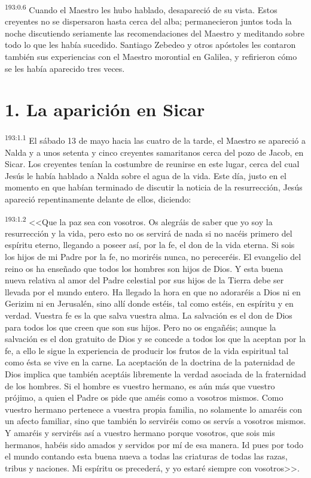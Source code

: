 \par 
\textsuperscript{193:0.6} Cuando el Maestro les hubo hablado, desapareció de su vista. Estos creyentes no se dispersaron hasta cerca del alba; permanecieron juntos toda la noche discutiendo seriamente las recomendaciones del Maestro y meditando sobre todo lo que les había sucedido. Santiago Zebedeo y otros apóstoles les contaron también sus experiencias con el Maestro morontial en Galilea, y refirieron cómo se les había aparecido tres veces.

\section*{1. La aparición en Sicar}
\par 
\textsuperscript{193:1.1} El sábado 13 de mayo hacia las cuatro de la tarde, el Maestro se apareció a Nalda y a unos setenta y cinco creyentes samaritanos cerca del pozo de Jacob, en Sicar. Los creyentes tenían la costumbre de reunirse en este lugar, cerca del cual Jesús le había hablado a Nalda sobre el agua de la vida. Este día, justo en el momento en que habían terminado de discutir la noticia de la resurrección, Jesús apareció repentinamente delante de ellos, diciendo:

\par 
\textsuperscript{193:1.2} <<Que la paz sea con vosotros. Os alegráis de saber que yo soy la resurrección y la vida, pero esto no os servirá de nada si no nacéis primero del espíritu eterno, llegando a poseer así, por la fe, el don de la vida eterna. Si sois los hijos de mi Padre por la fe, no moriréis nunca, no pereceréis. El evangelio del reino os ha enseñado que todos los hombres son hijos de Dios. Y esta buena nueva relativa al amor del Padre celestial por sus hijos de la Tierra debe ser llevada por el mundo entero. Ha llegado la hora en que no adoraréis a Dios ni en Gerizim ni en Jerusalén, sino allí donde estéis, tal como estéis, en espíritu y en verdad. Vuestra fe es la que salva vuestra alma. La salvación es el don de Dios para todos los que creen que son sus hijos. Pero no os engañéis; aunque la salvación es el don gratuito de Dios y se concede a todos los que la aceptan por la fe, a ello le sigue la experiencia de producir los frutos de la vida espiritual tal como ésta se vive en la carne. La aceptación de la doctrina de la paternidad de Dios implica que también aceptáis libremente la verdad asociada de la fraternidad de los hombres. Si el hombre es vuestro hermano, es aún más que vuestro prójimo, a quien el Padre os pide que améis como a vosotros mismos. Como vuestro hermano pertenece a vuestra propia familia, no solamente lo amaréis con un afecto familiar, sino que también lo serviréis como os servís a vosotros mismos. Y amaréis y serviréis así a vuestro hermano porque vosotros, que sois mis hermanos, habéis sido amados y servidos por mí de esa manera. Id pues por todo el mundo contando esta buena nueva a todas las criaturas de todas las razas, tribus y naciones. Mi espíritu os precederá, y yo estaré siempre con vosotros>>.

